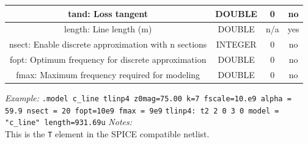 \documentclass{article}
\begin{document}
{\begin{table}[h]
\begin{tabular}{|c|c|c|c|}
\hline
tand: Loss tangent & DOUBLE & 0 & no \\
\hline
length: Line length (m) & DOUBLE & n/a & yes \\
\hline
nsect: Enable discrete approximation with n sections & INTEGER & 0 & no \\
\hline
fopt: Optimum frequency for discrete approximation & DOUBLE & 0 & no \\
\hline
fmax: Maximum frequency required for modeling & DOUBLE & 0 & no \\
\hline
\end{tabular}
\end{table}  
\noindent
\myThickLine
\newline
\textit{Example:}
\newline
\texttt{.model\ c\_line\ tlinp4\ z0mag=75.00 k=7 fscale=10.e9
alpha = 59.9 nsect = 20 fopt=10e9 fmax = 9e9}
\newline
\texttt{tlinp4:\ t2\ 2\ 0\ 3\ 0\ model = "c\_line"\
length=931.69u}
\newline
\myThickLine
\textit{Notes:}\\
This is the \texttt{T} element in the SPICE compatible netlist.\\

}
\end{document}
